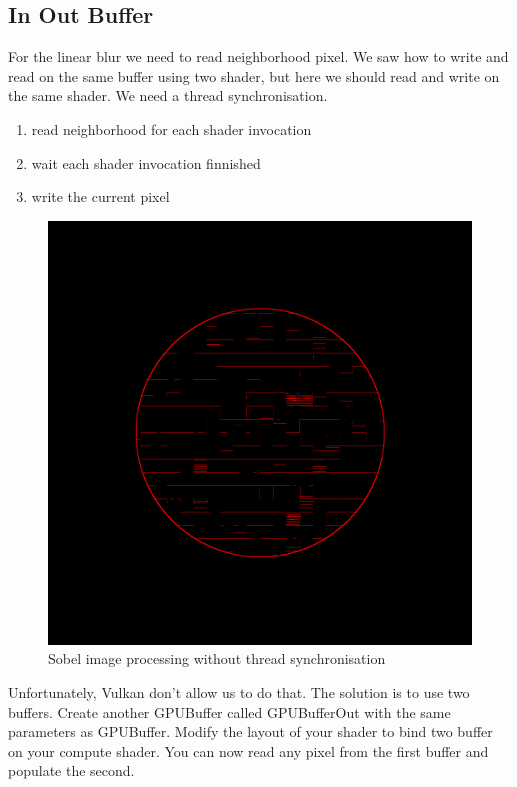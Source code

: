 \documentclass{article}
\begin{document}
\subsection{In Out Buffer}
For the linear blur we need to read neighborhood pixel. We saw how to write and read on the same buffer using two shader, but here we should read and write on the same shader. We need a thread synchronisation.

\begin{enumerate}
	\item read neighborhood for each shader invocation
	\item wait each shader invocation finnished
	\item write the current pixel
\end{enumerate}

\begin{figure}[H]
	\centering
	\includegraphics[scale=0.3]{figures/sobel.png}
	\caption{Sobel image processing without thread synchronisation}
\end{figure}

Unfortunately, Vulkan don't allow us to do that. The solution is to use two buffers. Create another GPUBuffer called GPUBufferOut with the same parameters as GPUBuffer. Modify the layout of your shader to bind two buffer on your compute shader. You can now read any pixel from the first buffer and populate the second.
\end{document}
